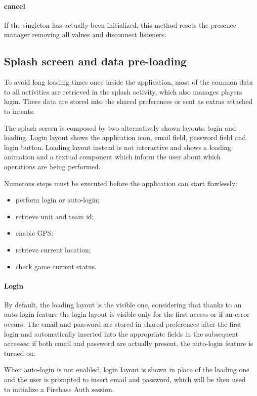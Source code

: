 			\paragraph{cancel}
			If the singleton has actually been initialized, this method resets the presence manager removing all values and disconnect listeners.
		
		\subsection{Splash screen and data pre-loading}\label{focus:splash}
		
			To avoid long loading times once inside the application, most of the common data to all activities are retrieved in the splash activity, which also manages players login.
			These data are stored into the shared preferences or sent as extras attached to intents.
			
			The splash screen is composed by two alternatively shown layouts: login and loading.
			Login layout shows the application icon, email field, password field and login button.
			Loading layout instead is not interactive and shows a loading animation and a textual component which inform the user about which operations are being performed.
			
			Numerous steps must be executed before the application can start flawlessly:
			\begin{itemize}
				\item perform login or auto-login;
				\item retrieve unit and team id;
				\item enable GPS;
				\item retrieve current location;
				\item check game current status.
			\end{itemize}
			
			\paragraph{Login}
			By default, the loading layout is the visible one, considering that thanks to an auto-login feature the login layout is visible only for the first access or if an error occurs.
			The email and password are stored in shared preferences after the first login and automatically inserted into the appropriate fields in the subsequent accesses: if both email and password are actually present, the auto-login feature is turned on.
			
			When auto-login is not enabled, login layout is shown in place of the loading one and the user is prompted to insert email and password, which will be then used to initialize a Firebase Auth session.
			
